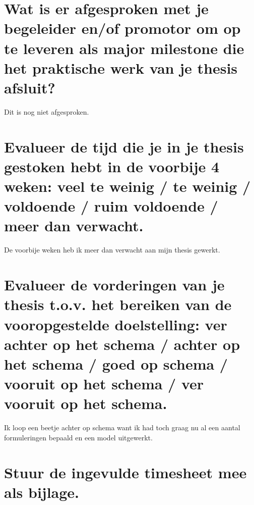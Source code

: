 \documentclass[a4paper, 11pt]{article}
\begin{document}
\section{Wat is er afgesproken met je begeleider en/of promotor om op te leveren als major milestone die het praktische werk van je thesis afsluit?}
Dit is nog niet afgesproken.
\section{Evalueer de tijd die je in je thesis gestoken hebt in de voorbije 4 weken: veel te weinig / te weinig / voldoende / ruim voldoende / meer dan verwacht.}
De voorbije weken heb ik meer dan verwacht aan mijn thesis gewerkt.  
\section{Evalueer de vorderingen van je thesis t.o.v. het bereiken van de vooropgestelde doelstelling: ver achter op het schema / achter op het schema / goed op schema / vooruit op het schema / ver vooruit op het schema.}
Ik loop een beetje achter op schema want ik had toch graag nu al een aantal formuleringen bepaald en een model uitgewerkt.
\section{Stuur de ingevulde timesheet mee als bijlage.}
\end{document}
